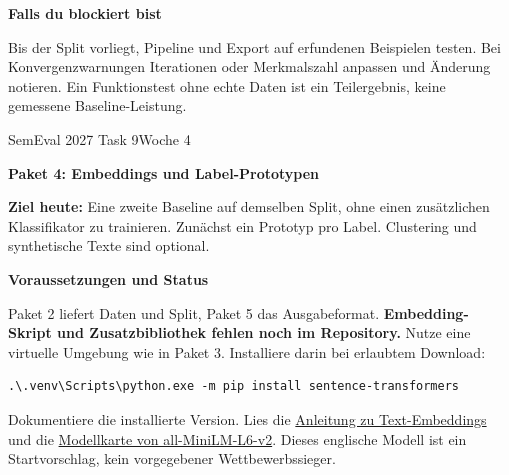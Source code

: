 \documentclass[10pt,a4paper]{article}
\newcommand{\planheading}[1]{\par\vspace{9pt}\textbf{#1}\par\vspace{3pt}}
\newcommand{\followuptitle}[1]{%
  {\small SemEval 2027 Task 9\hfill Woche 4\par}%
  \vspace{6pt}%
  {\fontsize{16}{19}\selectfont\bfseries #1\par}%
  \vspace{8pt}%
}
\begin{document}
\planheading{Falls du blockiert bist}
Bis der Split vorliegt, Pipeline und Export auf erfundenen Beispielen testen.
Bei Konvergenzwarnungen Iterationen oder Merkmalszahl anpassen und Änderung notieren.
Ein Funktionstest ohne echte Daten ist ein Teilergebnis, keine gemessene Baseline-Leistung.

\newpage
\hypertarget{plan-embeddings}{}
\followuptitle{Paket 4: Embeddings und Label-Prototypen}
\textbf{Ziel heute:} Eine zweite Baseline auf demselben Split, ohne einen zusätzlichen Klassifikator zu trainieren.
Zunächst ein Prototyp pro Label. Clustering und synthetische Texte sind optional.

\planheading{Voraussetzungen und Status}
Paket 2 liefert Daten und Split, Paket 5 das Ausgabeformat.
\textbf{Embedding-Skript und Zusatzbibliothek fehlen noch im Repository.}
Nutze eine virtuelle Umgebung wie in Paket 3. Installiere darin bei erlaubtem Download:
\begin{verbatim}
.\.venv\Scripts\python.exe -m pip install sentence-transformers
\end{verbatim}
Dokumentiere die installierte Version. Lies die
\href{https://www.sbert.net/docs/sentence_transformer/usage/semantic_textual_similarity.html}{Anleitung zu Text-Embeddings}
und die \href{https://huggingface.co/sentence-transformers/all-MiniLM-L6-v2}{Modellkarte von all-MiniLM-L6-v2}.
Dieses englische Modell ist ein Startvorschlag, kein vorgegebener Wettbewerbssieger.
\end{document}
